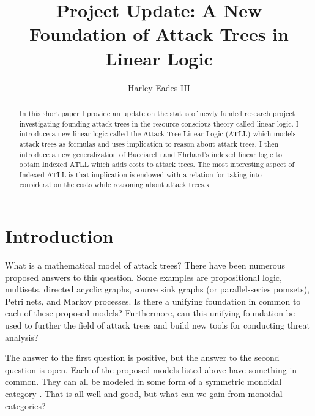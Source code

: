 \documentclass{llncs}
\date{}
\begin{document}

\title{Project Update: A New Foundation of Attack Trees in Linear Logic}

\author{Harley Eades III}

\maketitle 

\begin{abstract}
  In this short paper I provide an update on the status of newly
  funded research project investigating founding attack trees in the
  resource conscious theory called linear logic.  I introduce a new
  linear logic called the Attack Tree Linear Logic (ATLL) which models
  attack trees as formulas and uses implication to reason about attack
  trees.  I then introduce a new generalization of Bucciarelli and
  Ehrhard’s indexed linear logic to obtain Indexed ATLL which adds
  costs to attack trees.  The most interesting aspect of Indexed ATLL
  is that implication is endowed with a relation for taking into
  consideration the costs while reasoning about attack trees.x
\end{abstract}

\section{Introduction}
\label{sec:introduction}
What is a mathematical model of attack trees?  There have been
numerous proposed answers to this question.  Some examples are
propositional logic, multisets, directed acyclic graphs, source sink
graphs (or parallel-series pomsets), Petri nets, and Markov processes.
Is there a unifying foundation in common to each of these proposed
models?  Furthermore, can this unifying foundation be used to further
the field of attack trees and build new tools for conducting threat
analysis?

The answer to the first question is positive, but the answer to the
second question is open.  Each of the proposed models listed above
have something in common.  They can all be modeled in some form of a
symmetric monoidal category
\cite{Tzouvaras:1998,Brown:1991,Fiore:2013,FrancescoAlbasini2010}.
That is all well and good, but what can we gain from monoidal
categories?
\end{document}
